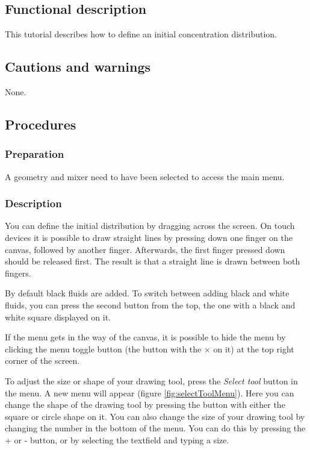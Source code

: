 \subsection{Functional description}
This tutorial describes how to define an initial concentration distribution.

\subsection{Cautions and warnings}
None.

\subsection{Procedures}
\subsubsection{Preparation}
A geometry and mixer need to have been selected to access the main menu.

\subsubsection{Description}
You can define the initial distribution by dragging across the screen. On touch devices it is possible to draw straight lines by pressing down one finger on the canvas, followed by another finger. Afterwards, the first finger pressed down should be released first. The result is that a straight line is drawn between both fingers.

By default black fluids are added. To switch between adding black and white fluids, you can press the second button from the top, the one with a black and white square displayed on it.

If the menu gets in the way of the canvas, it is possible to hide the menu by clicking the menu toggle button (the button with the $\times$ on it) at the top right corner of the screen.

 To adjust the size or shape of your drawing tool, press the \emph{Select tool} button in the menu. A new menu will appear (figure \ref{fig:selectToolMenu}). Here you can change the shape of the drawing tool by pressing the button with either the square or circle shape on it. You can also change the size of your drawing tool by changing the number in the bottom of the menu. You can do this by pressing the + or - button, or by selecting the textfield and typing a size.


